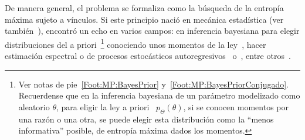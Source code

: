 De manera general, el problema se  formaliza como la b\'usqueda de la entrop\'ia
m\'axima  sujeto  a  v\'inculos.    Si  este  principio  naci\'o  en  mec\'anica
estad\'istica  (ver  tambi\'en~\cite{Jay57,   Jay57:2,  Jay65,  Mer10,  Mer18}),
encontr\'o  un  echo en  varios  campos:  en  inferencia bayesiana  para  elegir
distribuciones del a  priori~\footnote{Ver notas de pie~\ref{Foot:MP:BayesPrior}
  y~\ref{Foot:MP:BayesPriorConjugado}.    Recuerdense  que   en   la  inferencia
  bayesiana de un par\'ametro modelizado como aleatorio $\theta$, para eligir la
  ley a  priori \ $p_\Theta(\theta)$, si  se conocen momentos por  una raz\'on o
  una otra,  se puede elegir  esta distribuci\'on como la  ``menos informativa''
  posible,  \ie de  entrop\'ia m\'axima  dados los  momentos.}   conociendo unos
momentos  de  la  ley~\cite{Rob07,  Jay68,  Jay82,  Csi91},  hacer  estimaci\'on
espectral o de procesos estoc\'asticos autoregresivos~\cite{Bur67, Bur75, Jay82}
o~\cite[cap.~12]{CovTho06}, entre otros~\cite[\& ref.]{Arn01, Kap89, KapKes92}.

